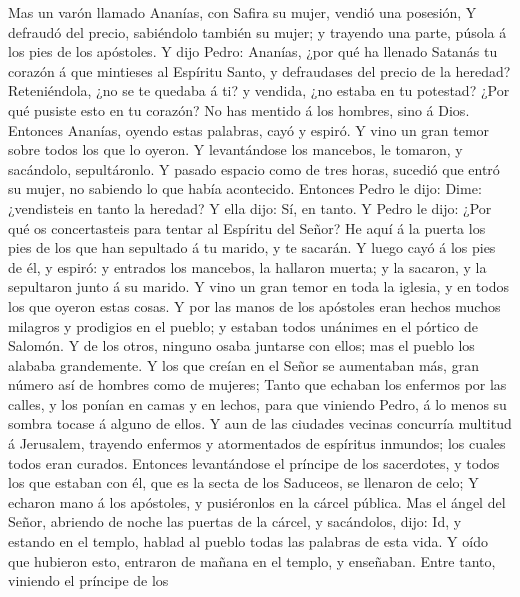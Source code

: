  Mas un varón llamado Ananías, con Safira su mujer, vendió
una posesión,  Y defraudó del precio, sabiéndolo también
su mujer; y trayendo una parte, púsola á los pies de los apóstoles.
 Y dijo Pedro: Ananías, ¿por qué ha llenado Satanás tu
corazón á que mintieses al Espíritu Santo, y defraudases del precio de
la heredad?  Reteniéndola, ¿no se te quedaba á ti? y
vendida, ¿no estaba en tu potestad? ¿Por qué pusiste esto en tu corazón?
No has mentido á los hombres, sino á Dios.  Entonces
Ananías, oyendo estas palabras, cayó y espiró. Y vino un gran temor
sobre todos los que lo oyeron.  Y levantándose los
mancebos, le tomaron, y sacándolo, sepultáronlo.  Y pasado
espacio como de tres horas, sucedió que entró su mujer, no sabiendo lo
que había acontecido.  Entonces Pedro le dijo: Dime:
¿vendisteis en tanto la heredad? Y ella dijo: Sí, en tanto.
 Y Pedro le dijo: ¿Por qué os concertasteis para tentar al
Espíritu del Señor? He aquí á la puerta los pies de los que han
sepultado á tu marido, y te sacarán.  Y luego cayó á los
pies de él, y espiró: y entrados los mancebos, la hallaron muerta; y la
sacaron, y la sepultaron junto á su marido.  Y vino un
gran temor en toda la iglesia, y en todos los que oyeron estas cosas.
 Y por las manos de los apóstoles eran hechos muchos
milagros y prodigios en el pueblo; y estaban todos unánimes en el
pórtico de Salomón.  Y de los otros, ninguno osaba
juntarse con ellos; mas el pueblo los alababa grandemente.
 Y los que creían en el Señor se aumentaban más, gran
número así de hombres como de mujeres;  Tanto que echaban
los enfermos por las calles, y los ponían en camas y en lechos, para que
viniendo Pedro, á lo menos su sombra tocase á alguno de ellos.
 Y aun de las ciudades vecinas concurría multitud á
Jerusalem, trayendo enfermos y atormentados de espíritus inmundos; los
cuales todos eran curados.  Entonces levantándose el
príncipe de los sacerdotes, y todos los que estaban con él, que es la
secta de los Saduceos, se llenaron de celo;  Y echaron
mano á los apóstoles, y pusiéronlos en la cárcel pública.
 Mas el ángel del Señor, abriendo de noche las puertas de
la cárcel, y sacándolos, dijo:  Id, y estando en el
templo, hablad al pueblo todas las palabras de esta vida.
 Y oído que hubieron esto, entraron de mañana en el
templo, y enseñaban. Entre tanto, viniendo el príncipe de los
